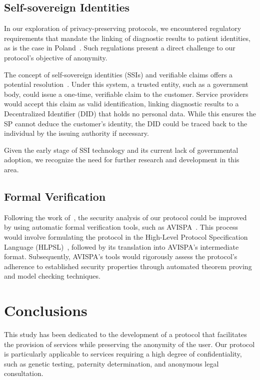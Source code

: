 \documentclass[pdftex,twocolumn,epjc3]{svjour3}
\begin{document}
\subsection{Self-sovereign Identities}
In our exploration of privacy-preserving protocols, we encountered regulatory requirements that mandate the linking of diagnostic results to patient identities, as is the case in Poland~\cite{ministerstwozdrowiaRegulationMinisterHealth2006}. Such regulations present a direct challenge to our protocol's objective of anonymity.

The concept of self-sovereign identities (SSIs) and verifiable claims offers a potential resolution~\cite{muhleSurveyEssentialComponents2018}. Under this system, a trusted entity, such as a government body, could issue a one-time, verifiable claim to the customer. Service providers would accept this claim as valid identification, linking diagnostic results to a Decentralized Identifier (DID) that holds no personal data. While this ensures the SP cannot deduce the customer's identity, the DID could be traced back to the individual by the issuing authority if necessary.

Given the early stage of SSI technology and its current lack of governmental adoption, we recognize the need for further research and development in this area.

\subsection{Formal Verification}\label{sec:formal-verification}
Following the work of~\cite{birjoveanuFormalVerificationMultiparty2022}, the security analysis of our protocol could be improved by using automatic formal verification tools, such as AVISPA~\cite{armandoAVISPAToolAutomated2005}. This process would involve formulating the protocol in the High-Level Protocol Specification Language (HLPSL)~\cite{chevalierHighLevelProtocol2004}, followed by its translation into AVISPA's intermediate format. Subsequently, AVISPA's tools would rigorously assess the protocol's adherence to established security properties through automated theorem proving and model checking techniques.

\section{Conclusions}\label{sec:conclusion}

This study has been dedicated to the development of a protocol that facilitates the provision of services while preserving the anonymity of the user. Our protocol is particularly applicable to services requiring a high degree of confidentiality, such as genetic testing, paternity determination, and anonymous legal consultation.
\end{document}
